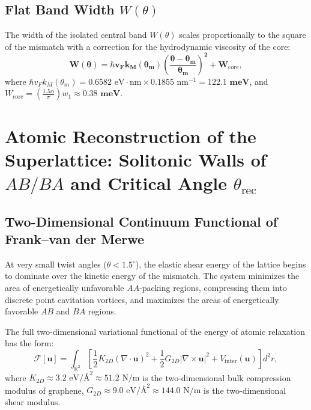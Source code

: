 \documentclass[12pt,a4paper]{article}
\begin{document}
			\subsection{Flat Band Width $W(\theta)$}
			The width of the isolated central band $W(\theta)$ scales proportionally to the square of the mismatch with a correction for the hydrodynamic viscosity of the core:
			\begin{equation}
				\mathbf{W(\theta) = \hbar v_F k_M(\theta_m) \left( \frac{\theta - \theta_m}{\theta_m} \right)^2 + W_{\mathrm{core}}},
			\end{equation}
			where $\hbar v_F k_M(\theta_m) = 0.6582\text{ eV}\cdot\text{nm} \times 0.1855\text{ nm}^{-1} = \mathbf{122.1\text{ meV}}$, and $W_{\text{core}} = \left(\frac{1.5\alpha}{\pi}\right) w_1 \approx \mathbf{0.38\text{ meV}}$.
			
			\section{Atomic Reconstruction of the Superlattice: Solitonic Walls of $AB/BA$ and Critical Angle $\theta_{\mathrm{rec}}$}
			
			\subsection{Two-Dimensional Continuum Functional of Frank--van der Merwe}
			At very small twist angles ($\theta < 1.5^\circ$), the elastic shear energy of the lattice begins to dominate over the kinetic energy of the mismatch. The system minimizes the area of energetically unfavorable $AA$-packing regions, compressing them into discrete point cavitation vortices, and maximizes the areas of energetically favorable $AB$ and $BA$ regions.
			
			The full two-dimensional variational functional of the energy of atomic relaxation has the form:
			\begin{equation}
				\mathcal{F}[\mathbf{u}] = \int_{\mathbb{R}^2} \left[ \frac{1}{2} K_{2D} (\nabla \cdot \mathbf{u})^2 + \frac{1}{2} G_{2D} |\nabla \times \mathbf{u}|^2 + V_{\text{inter}}(\mathbf{u}) \right] d^2r,
			\end{equation}
			where $K_{2D} \approx 3.2\text{ eV/\AA}^2 \approx 51.2\text{ N/m}$ is the two-dimensional bulk compression modulus of graphene, $G_{2D} \approx 9.0\text{ eV/\AA}^2 \approx 144.0\text{ N/m}$ is the two-dimensional shear modulus.
			
\end{document}
